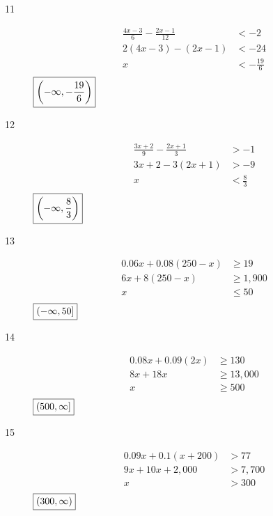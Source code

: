 \documentclass[letterpaper, landscape]{exam}
\begin{document}
\begin{description}
      \item[11]
        \begin{align*}
          \frac{4x - 3}{6} - \frac{2x - 1}{12} & < -2 \\
          2 (4x - 3) - (2x - 1)                & < -24 \\
          x                                    & < - \frac{19}{6} \\
        \end{align*}
        $\boxed{ \intoo{ -\infty, - \frac{19}{6} } }$

      \item[12]
        \begin{align*}
          \frac{3x + 2}{9} - \frac{2x + 1}{3} & > -1 \\
          3x + 2 - 3(2x + 1)                  & > -9 \\
          x                                   & < \frac{8}{3} \\
        \end{align*}
        $\boxed{ \intoo{ -\infty, \frac{8}{3} } }$

      \item[13]
        \begin{align*}
          0.06x + 0.08 (250 - x) & \geq 19 \\
          6x + 8(250 - x)        & \geq 1,900 \\
          x                      & \leq 50 \\
        \end{align*}
        $\boxed{ \intoc{ -\infty, 50 } }$

      \item[14]
        \begin{align*}
          0.08x + 0.09 (2x) & \geq 130 \\
          8x + 18x          & \geq 13,000 \\
          x                 & \geq 500 \\
        \end{align*}
        $\boxed{ \intoc{ 500, \infty } }$

      \item[15]
        \begin{align*}
          0.09x + 0.1 (x + 200) & > 77 \\
          9x + 10x + 2,000      & > 7,700 \\
          x                     & > 300 \\
        \end{align*}
        $\boxed{ \intoo{ 300, \infty } }$


\end{description}
\end{document}
